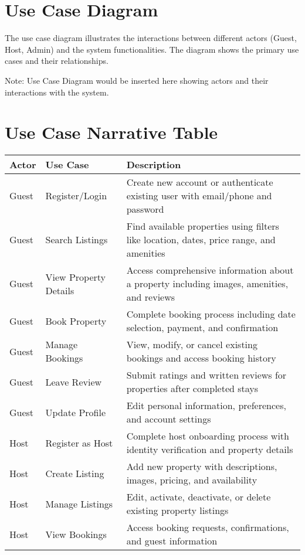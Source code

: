\documentclass[12pt,a4paper]{report}
\begin{document}
\section{Use Case Diagram}
The use case diagram illustrates the interactions between different actors (Guest, Host, Admin) and the system functionalities. The diagram shows the primary use cases and their relationships.

Note: Use Case Diagram would be inserted here showing actors and their interactions with the system.

\section{Use Case Narrative Table}

\begin{longtable}{|p{2.5cm}|p{4cm}|p{7.5cm}|}
\hline
\textbf{Actor} & \textbf{Use Case} & \textbf{Description} \\
\hline
Guest & Register/Login & Create new account or authenticate existing user with email/phone and password \\
\hline
Guest & Search Listings & Find available properties using filters like location, dates, price range, and amenities \\
\hline
Guest & View Property Details & Access comprehensive information about a property including images, amenities, and reviews \\
\hline
Guest & Book Property & Complete booking process including date selection, payment, and confirmation \\
\hline
Guest & Manage Bookings & View, modify, or cancel existing bookings and access booking history \\
\hline
Guest & Leave Review & Submit ratings and written reviews for properties after completed stays \\
\hline
Guest & Update Profile & Edit personal information, preferences, and account settings \\
\hline
Host & Register as Host & Complete host onboarding process with identity verification and property details \\
\hline
Host & Create Listing & Add new property with descriptions, images, pricing, and availability \\
\hline
Host & Manage Listings & Edit, activate, deactivate, or delete existing property listings \\
\hline
Host & View Bookings & Access booking requests, confirmations, and guest information \\

\end{longtable}
\end{document}
